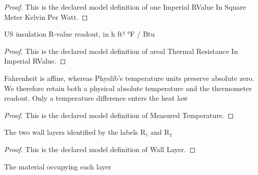 \begin{proof}
  This is the declared model definition of one Imperial RValue In Square Meter Kelvin Per Watt.
\end{proof}
\begin{definition}
  \label{def:physics:phyx-mini-0487:phyxminiproblems-problemphyxmini0487-arealthermalresistanceinimperialrvalue}
  US insulation R-value readout, in h ft² °F / Btu
\end{definition}
\begin{proof}
  This is the declared model definition of areal Thermal Resistance In Imperial RValue.
\end{proof}
\begin{definition}
  \label{def:physics:phyx-mini-0487:phyxminiproblems-problemphyxmini0487-measuredtemperature}
  Fahrenheit is affine, whereas Physlib's temperature units preserve absolute zero. We therefore retain both a physical absolute temperature and the thermometer readout. Only a temperature difference enters the heat law
\end{definition}
\begin{proof}
  This is the declared model definition of Measured Temperature.
\end{proof}
\begin{definition}
  \label{def:physics:phyx-mini-0487:phyxminiproblems-problemphyxmini0487-walllayer}
  The two wall layers identified by the labels R₁ and R₂
\end{definition}
\begin{proof}
  This is the declared model definition of Wall Layer.
\end{proof}
\begin{definition}
  \label{def:physics:phyx-mini-0487:phyxminiproblems-problemphyxmini0487-wallmaterial}
  The material occupying each layer
\end{definition}
